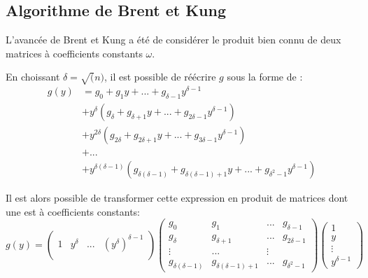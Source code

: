 \documentclass[a4paper]{article}
\begin{document}
\subsection{Algorithme de Brent et Kung}

L'avancée de Brent et Kung a été de considérer le produit bien connu de deux matrices à coefficients constants $\omega$.


En choissant $\delta = \sqrt(n)$, il est possible de réécrire $g$ sous la forme de :
\begin{align*}
    g(y) &= g_0 + g_1y + ... + g_{\delta-1}y^{\delta-1} \\
        &+ y^\delta(g_\delta + g_{\delta+1}y + ... + g_{2\delta-1}y^{\delta-1}) \\
                                      &+ y^{2\delta}(g_{2\delta} + g_{2\delta+1}y + ... + g_{3\delta-1}y^{\delta-1}) \\
                                      &+ ... \\
                                      &+ y^{\delta(\delta-1)}(g_{\delta(\delta-1)} + g_{\delta(\delta-1)+1}y + ... + g_{\delta^2-1}y^{\delta-1}) 
\end{align*}

Il est alors possible de transformer cette expression en produit de matrices dont une est à coefficients constants:
\[
g(y) = 
\begin{pmatrix}
    1 & y^\delta & ... & (y^\delta)^{\delta-1}  \\  
\end{pmatrix}
\begin{pmatrix}
    g_0 & g_1 & ... & g_{\delta-1} \\
    g_{\delta} & g_{\delta+1} & ... & g_{2\delta-1} \\
    \vdots & ... & \vdots \\
    g_{\delta(\delta-1)} & g_{\delta(\delta-1)+1} & ... & g_{\delta^2-1}
\end{pmatrix}
\begin{pmatrix}
    1 \\
    y \\
    \vdots \\
    y^{\delta-1}
\end{pmatrix}
\]
\end{document}
